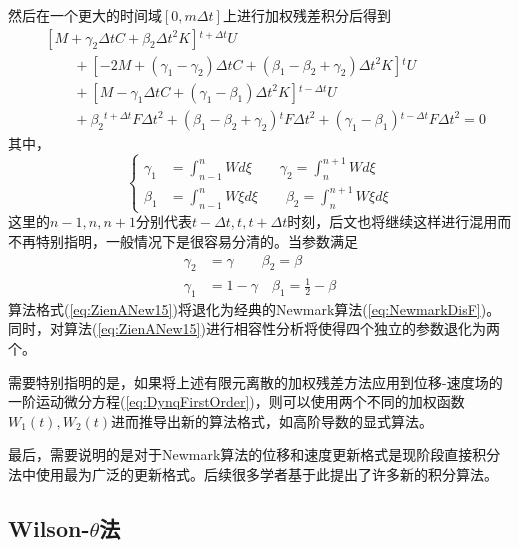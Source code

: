 然后在一个更大的时间域$[0,m\Delta t]$上进行加权残差积分后得到
\begin{equation}
\begin{aligned}
&[M+\gamma_2\Delta tC+\beta_2\Delta t^2K]{^{t+\Delta t}\!U}\\
&\qquad+[-2M+(\gamma_1-\gamma_2)\Delta tC+(\beta_1-\beta_2+\gamma_2)\Delta t^2K]{^t\!U}\\
&\qquad+[M-\gamma_1\Delta tC+(\gamma_1-\beta_1)\Delta t^2K]{^{t-\Delta t}\!U}\\
&\qquad+\beta_2{^{t+\Delta t}\!F}\Delta t^2+(\beta_1-\beta_2+\gamma_2){^t\!F}\Delta t^2+(\gamma_1-\beta_1){^{t-\Delta t}\!F}\Delta t^2=0
\end{aligned}\label{eq:ZienANew15}
\end{equation}
其中，
\begin{equation}
\left\{\begin{aligned}
\gamma_1&=\int_{n-1}^nWd\xi \qquad \gamma_2=\int_{n}^{n+1}Wd\xi\\
\beta_1&=\int_{n-1}^nW\xi d\xi \qquad \beta_2=\int_{n}^{n+1}W\xi d\xi
\end{aligned}\right.
\end{equation}
这里的$n-1,n,n+1$分别代表$t-\Delta t,t,t+\Delta t$时刻，后文也将继续这样进行混用而不再特别指明，一般情况下是很容易分清的。当参数满足
\begin{equation}
\begin{aligned}
\gamma_2&=\gamma\qquad\beta_2=\beta\\
\gamma_1&=1-\gamma\quad \beta_1=\frac12-\beta
\end{aligned}
\end{equation}
算法格式(\ref{eq:ZienANew15})将退化为经典的Newmark算法(\ref{eq:NewmarkDisF})。同时，对算法(\ref{eq:ZienANew15})进行相容性分析将使得四个独立的参数退化为两个。

需要特别指明的是，如果将上述有限元离散的加权残差方法应用到位移-速度场的一阶运动微分方程(\ref{eq:DynqFirstOrder})，则可以使用两个不同的加权函数$W_1(t),W_2(t)$进而推导出新的算法格式，如高阶导数的显式算法\cite{Hoff1990,Hoff1990a}。

最后，需要说明的是对于Newmark算法的位移和速度更新格式是现阶段直接积分法中使用最为广泛的更新格式。后续很多学者基于此提出了许多新的积分算法\cite{Hilber1978,Hilber1977,Wood1980a,KaiPing2008}。
 
\subsection{Wilson-$\theta$法}

